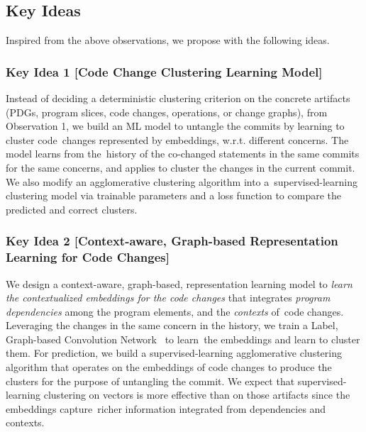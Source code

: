\subsection{Key Ideas}
\label{ideas:sec}

Inspired from the above observations, we propose {\tool} with the
following ideas.



\subsubsection{\bf Key Idea 1 [Code Change Clustering Learning Model]}

Instead of deciding a deterministic clustering criterion on the
concrete artifacts (PDGs, program slices, code changes, operations, or
change graphs), from Observation 1, we build an ML model to untangle
the commits by learning to cluster code~changes represented by
embeddings, w.r.t. different concerns. The model learns from
the~history of the co-changed statements in the same commits for the
same concerns, and applies to cluster the changes in the current
commit.  We also modify an agglomerative clustering algorithm into
a~super\-vised-learning clustering model via trainable parameters and
a loss function to compare the predicted and correct clusters.


\subsubsection{\bf Key Idea 2 [Context-aware, Graph-based
    Representation Learning for Code Changes]}

We design a context-aware, graph-based, representation learning model
to {\em learn the contextualized embeddings for the code changes} that
integrates {\em program dependencies} among the program elements, and
the {\em contexts} of~code changes. Leveraging the changes in the same
concern in the history, we train a Label, Graph-based Convolution
Network~\cite{label-gcn} to learn~the embeddings and learn to cluster
them.
For prediction, we build a supervised-learning agglomerative
clustering algorithm that operates on the embeddings of code changes
to produce the clusters for the purpose of untangling the commit. We
expect that supervised-learning clustering on vectors is more
effective than on those artifacts since the embeddings capture~richer
information integrated from dependencies and contexts.

